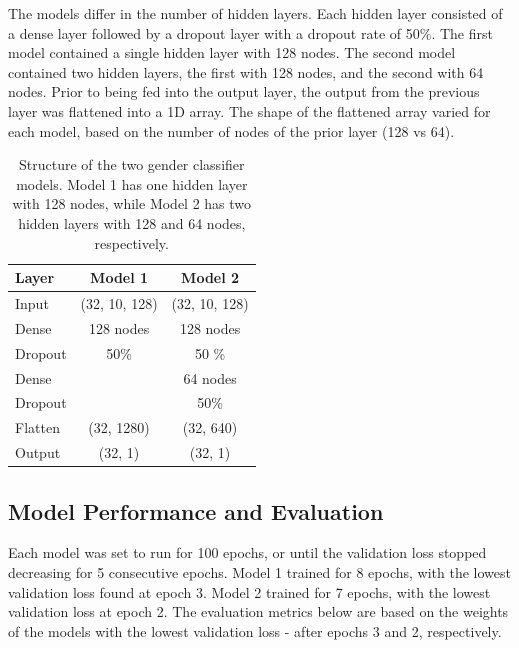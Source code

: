 The models differ in the number of hidden layers. Each hidden layer consisted of a dense layer followed by a dropout layer with a dropout rate of 50\%. The first model contained a single hidden layer with 128 nodes. The second model contained two hidden layers, the first with 128 nodes, and the second with 64 nodes. Prior to being fed into the output layer, the output from the previous layer was flattened into a 1D array. The shape of the flattened array varied for each model, based on the number of nodes of the prior layer (128 vs 64).

\begin{table}[!h]
\begin{center}
\caption{Structure of the two gender classifier models. Model 1 has one hidden layer with 128 nodes, while Model 2 has two hidden layers with 128 and 64 nodes, respectively.}
\begin{tabular}{l | c | c |}

Layer  & Model 1 & Model 2\\
\hline

Input 	& (32, 10, 128) & (32, 10, 128) \\ \hline

Dense	& 128 nodes & 128 nodes \\
Dropout	& 50\%		& 50 \% \\ \hline

Dense	&			& 64 nodes \\
Dropout	& 			& 50\% \\ \hline

Flatten 	& (32, 1280)	& (32, 640) \\ \hline
Output 	& (32, 1)		& (32, 1)\\
\hline
\end{tabular}
\label{tab:GenModels}
\end{center}
\end{table}

\subsection{Model Performance and Evaluation}

Each model was set to run for 100 epochs, or until the validation loss stopped decreasing for 5 consecutive epochs. Model 1 trained for 8 epochs, with the lowest validation loss found at epoch 3. Model 2 trained for 7 epochs, with the lowest validation loss at epoch 2. The evaluation metrics below are based on the weights of the models with the lowest validation loss - after epochs 3 and 2, respectively.

